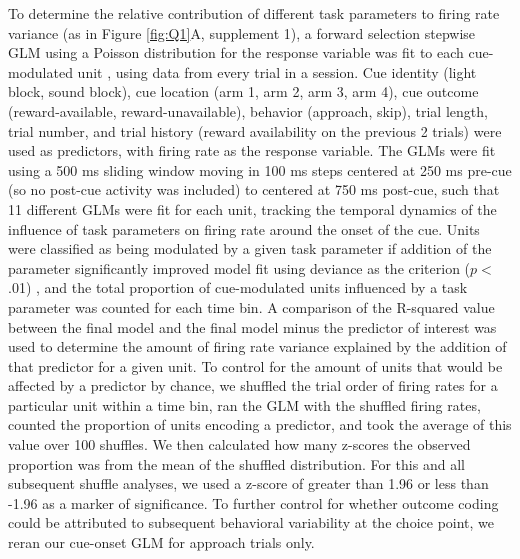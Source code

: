 \documentclass[11pt]{article}
\providecommand{\DIFadd}[1]{{\protect\color{red} \sf #1}} %
\providecommand{\DIFdel}[1]{} %
\providecommand{\DIFaddbegin}{} %
\providecommand{\DIFaddend}{} %
\providecommand{\DIFdelbegin}{} %
\providecommand{\DIFdelend}{} %
\newcommand{\DIFscaledelfig}{0.5}
\newlength{\DIFdelgraphicswidth} %
\newlength{\DIFdelgraphicsheight} %
\newcommand{\DIFaddincludegraphics}[2][]{{\color{red}\fbox{\DIFOincludegraphics[#1]{#2}}}} %
\newcommand{\DIFdelincludegraphics}[2][]{%
\sbox{\DIFdelgraphicsbox}{\DIFOincludegraphics[#1]{#2}}%
\settoboxwidth{\DIFdelgraphicswidth}{\DIFdelgraphicsbox} %
\settoboxtotalheight{\DIFdelgraphicsheight}{\DIFdelgraphicsbox} %
\scalebox{\DIFscaledelfig}{%
\parbox[b]{\DIFdelgraphicswidth}{\usebox{\DIFdelgraphicsbox}\\[-\baselineskip] \rule{\DIFdelgraphicswidth}{0em}}\llap{\resizebox{\DIFdelgraphicswidth}{\DIFdelgraphicsheight}{%
\setlength{\unitlength}{\DIFdelgraphicswidth}%
\begin{picture}(1,1)%
\thicklines\linethickness{2pt} %
{\color[rgb]{1,0,0}\put(0,0){\framebox(1,1){}}}%
{\color[rgb]{1,0,0}\put(0,0){\line( 1,1){1}}}%
{\color[rgb]{1,0,0}\put(0,1){\line(1,-1){1}}}%
\end{picture}%
}\hspace*{3pt}}} %
} %
\DeclareRobustCommand{\DIFaddbegin}{\DIFOaddbegin \let\includegraphics\DIFaddincludegraphics} %
\DeclareRobustCommand{\DIFaddend}{\DIFOaddend \let\includegraphics\DIFOincludegraphics} %
\DeclareRobustCommand{\DIFdelbegin}{\DIFOdelbegin \let\includegraphics\DIFdelincludegraphics} %
\DeclareRobustCommand{\DIFdelend}{\DIFOaddend \let\includegraphics\DIFOincludegraphics} %
\begin{document}
To determine the relative contribution of different task parameters to firing rate variance (as in \DIFdelbegin \DIFdel{Figures \ref{fig:examples}-\ref{fig:GLM}}\DIFdelend \DIFaddbegin \DIFadd{Figure \ref{fig:Q1}A, supplement 1}\DIFaddend ), a forward selection stepwise \DIFdelbegin \DIFdel{general linear model (GLM ) }\DIFdelend \DIFaddbegin \DIFadd{GLM using a Poisson distribution for the response variable }\DIFaddend was fit to each cue-modulated unit\DIFaddbegin \DIFadd{, using data from every trial in a session}\DIFaddend . Cue identity (light block, sound block), cue location (arm 1, arm 2, arm 3, arm 4), cue outcome (reward-available, reward-unavailable), behavior (approach, skip), trial length, trial number, and trial history (reward availability on the previous 2 trials) were used as predictors, \DIFdelbegin \DIFdel{and the 1 s post-cue }\DIFdelend \DIFaddbegin \DIFadd{with }\DIFaddend firing rate as the response variable. \DIFaddbegin \DIFadd{The GLMs were fit using a 500 ms sliding window moving in 100 ms steps centered at 250 ms pre-cue (so no post-cue activity was included) to centered at 750 ms post-cue, such that 11 different GLMs were fit for each unit, tracking the temporal dynamics of the influence of task parameters on firing rate around the onset of the cue. }\DIFaddend Units were classified as being modulated by a given task parameter if addition of the parameter significantly improved model fit using deviance as the criterion ($p <$ .01)\DIFaddbegin \DIFadd{, and the total proportion of cue-modulated units influenced by a task parameter was counted for each time bin}\DIFaddend . A comparison of the R-squared value between the final model and the final model minus the predictor of interest was used to determine the amount of firing rate variance explained by the addition of that predictor for a given unit. To \DIFdelbegin \DIFdel{investigate more finely the temporal dynamics of the influence of task parameters to unit activity, we then fit a sliding window }\DIFdelend \DIFaddbegin \DIFadd{control for the amount of units that would be affected by a predictor by chance, we shuffled the trial order of firing rates for a particular unit within a time bin, ran the }\DIFaddend GLM with the \DIFdelbegin \DIFdel{same task parameters using 500 ms bins and 100 ms steps, starting 500 ms before cue-onset, up to 500 ms after cue-onset, and measured }\DIFdelend \DIFaddbegin \DIFadd{shuffled firing rates, counted }\DIFaddend the proportion of units \DIFdelbegin \DIFdel{and average R-squared value for a given time bin
where a particular predictor contributed significantly to the final model. To control for the amount of units that would be affected by a predictor by }\DIFdelend \DIFaddbegin \DIFadd{encoding a predictor, and took the average of this value over 100 shuffles. We then calculated how many z-scores the observed proportion was from the mean of the shuffled distribution. For this and all subsequent shuffle analyses, we used a z-score of greater than 1.96 or less than -1.96 as a marker of significance. To further control for whether outcome coding could be attributed to subsequent behavioral variability at the choice point, we reran our cue-onset GLM for approach trials only.
}
\end{document}
